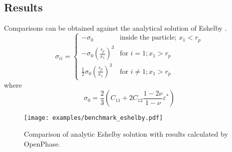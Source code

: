 \subsection{Results}
Comparisons can be obtained against the analytical solution of Eshelby .
\begin{equation}
 \sigma_{ii}=\left\{
\begin{array}{cl}
-\sigma_0 & \textrm{inside the particle; } x_1 < r_p\\
 -\sigma_0\left(\frac{r_p}{x_1}\right)^3 & \textrm{for } i=1; x_1 > r_p\\
 \frac{1}{2}\sigma_0\left(\frac{r_p}{x_1}\right)^3 & \textrm{for }i \neq 1; x_1 > r_p
 \end{array}\right.
 \label{eq:EshelbyTest_AnalyticalSolution}
\end{equation}
where
\begin{equation}
\sigma_0 = \frac{2}{3}\left(C_{11}+2C_{12}\frac{1-2\nu}{1-\nu}\varepsilon^*\right)
\end{equation}

\begin{figure}
\centering
\texttt{[image: examples/benchmark\_eshelby.pdf]}
\label{fig:example_eshelby}
\caption{Comparison of analytic Eshelby solution with results calculated by OpenPhase.}
\end{figure}
